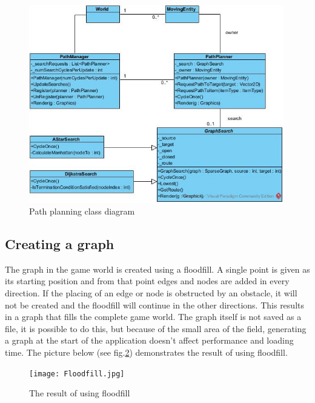 \documentclass[11pt]{article}
\begin{document}
    \begin{figure}[h!]

        \includegraphics[width=30em]{PathFinding.jpg}

        \caption{Path planning class diagram}

        \label{fig:pathPlanClassDiagram}

    \end{figure}
    
    \subsection{Creating a graph}\label{subsec:pathgraphcreation}
    The graph in the game world is created using a floodfill.
    A single point is given as its starting position and from that point edges and nodes are added in every direction.
    If the placing of an edge or node is obstructed by an obstacle, it will not be created and the floodfill will continue
    in the other directions.
    This results in a graph that fills the complete game world.
    The graph itself is not saved as a file, it is possible to do this, but because of the small area of the field,
    generating a graph at the start of the application doesn't affect performance and loading time.
    The picture below (see fig.\ref{fig:pathPlanFloodfill}) demonstrates the result of using floodfill.

    \begin{figure}[h!]

        \texttt{[image: Floodfill.jpg]}

        \caption{The result of using floodfill}

        \label{fig:pathPlanFloodfill}

    \end{figure}
    
\end{document}
